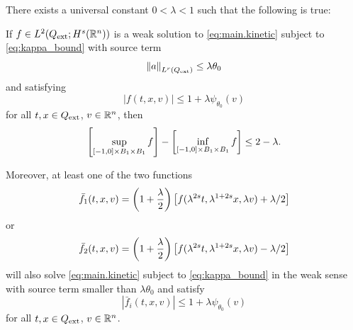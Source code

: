 \begin{lemma}\label{thm:oscillation}
There exists a universal constant $0 < \lambda < 1$ such that the following is true: 

If $f \in L^2({Q_\textrm{ext}}; H^s(\mathbb{R}^n))$ is a weak solution to \eqref{eq:main.kinetic} subject to \eqref{eq:kappa_bound} with source term
\[ \left\lVert a\right\rVert_{L^{r}({Q_\textrm{ext}})} \leq \lambda \theta_0 \]
and satisfying
\begin{equation}\label{f_leq_1+psi}
|f(t,x,v)| \leq 1 + \lambda \psi_{\theta_0}(v) 
\end{equation}
for all $t,x \in {Q_\textrm{ext}}$, $v \in \mathbb{R}^n$, then
\[ \left[ \sup_{[-1,0]\times B_1 \times B_1} f \right] - \left[ \inf_{[-1,0]\times B_1 \times B_1} f \right] \leq 2 - \lambda. \]

Moreover, at least one of the two functions
\[ \bar{f}_1(t,x,v) = \left( 1+\frac{\lambda}{2} \right)\left[ f(\lambda^{2s} t, \lambda^{1+2s} x, \lambda v) + \lambda/2 \right] \]
or
\[ \bar{f}_2(t,x,v) = \left( 1+\frac{\lambda}{2} \right)\left[ f(\lambda^{2s} t, \lambda^{1+2s} x, \lambda v) - \lambda/2 \right] \]
will also solve \eqref{eq:main.kinetic} subject to \eqref{eq:kappa_bound} in the weak sense with source term smaller than $\lambda \theta_0$ and satisfy 
\[ |\bar{f}_i(t,x,v)| \leq 1 + \lambda \psi_{\theta_0}(v) \]
for all $t,x \in {Q_\textrm{ext}}$, $v \in \mathbb{R}^n$.  

\end{lemma}

